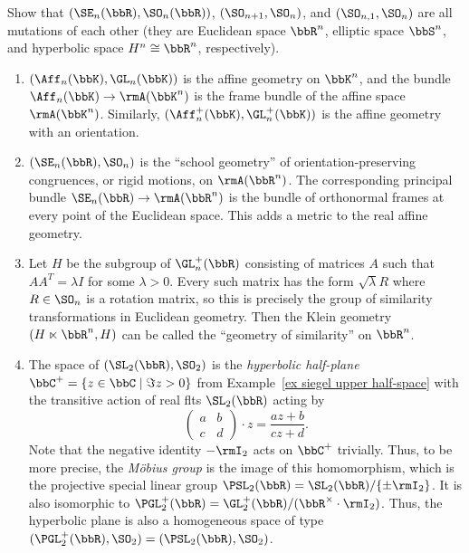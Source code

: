 \begin{xca}
    Show that $(\SE_n(\bbR),\SO_n(\bbR))$, $(\SO_{n+1},\SO_n)$, and $(\SO_{n,1},\SO_n)$ are all mutations of each other (they are Euclidean space $\bbR^n$, elliptic space $\bbS^n$, and hyperbolic space $H^n\cong\bbR^n$, respectively).
\end{xca}




\begin{example}
    \begin{enumerate}
        \item $(\Aff_n(\bbK), \GL_n(\bbK))$ is the affine geometry on $\bbK^n$, and the bundle $\Aff_n(\bbK)\to \rmA(\bbK^n)$ is the frame bundle of the affine space $\rmA(\bbK^n)$. Similarly, $(\Aff_n^+(\bbK), \GL_n^+(\bbK))$ is the affine geometry with an orientation.

        \item $(\SE_n(\bbR),\SO_n)$ is the ``school geometry'' of orientation-preserving congruences, or rigid motions, on $\rmA(\bbR^n)$. The corresponding principal bundle $\SE_n(\bbR)\to \rmA(\bbR^n)$ is the bundle of orthonormal frames at every point of the Euclidean space. This adds a metric to the real affine geometry.

        \item Let $H$ be the subgroup of $\GL_n^+(\bbR)$ consisting of matrices $A$ such that $AA^T=\lambda I$ for some $\lambda>0$. Every such matrix has the form $\sqrt{\lambda}R$ where $R\in\SO_n$ is a rotation matrix, so this is precisely the group of similarity transformations in Euclidean geometry. Then the Klein geometry $(H\ltimes \bbR^n,H)$ can be called the ``geometry of similarity'' on $\bbR^n$.
        
        \item The space of $(\SL_2(\bbR),\SO_2)$ is the \emph{hyperbolic half-plane} $\bbC^+=\{z\in \bbC\mid \Im z>0\}$ from Example~\ref{ex siegel upper half-space} with the transitive action of real \glspl{flt} $\SL_2(\bbR)$ acting by 
        \[\begin{pmatrix}
            a&b\\c&d
        \end{pmatrix}\cdot z=\frac{az+b}{cz+d}.\]
        Note that the negative identity $-\rmI_2$ acts on $\bbC^+$ trivially. Thus, to be more precise, the \emph{M\"obius group} is the image of this homomorphism, which is the projective special linear group $\PSL_2(\bbR)=\SL_2(\bbR)\slash \{\pm \rmI_2\}$. It is also isomorphic to $\PGL^+_2(\bbR)=\GL^+_2(\bbR)\slash (\bbR^\times\cdot \rmI_2)$. Thus, the hyperbolic plane is also a homogeneous space of type $(\PGL^+_2(\bbR),\SO_2)=(\PSL_2(\bbR),\SO_2)$.


\end{enumerate}
\end{example}
